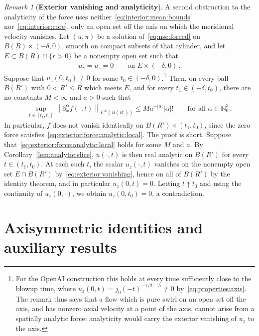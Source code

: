 \documentclass[11pt,reqno]{amsproc}
\numberwithin{equation}{section}
\theoremstyle{remark}
\newtheorem{remark}[theorem]{Remark}
\newcommand{\p}{\partial}
\newcommand{\norm}[1]{\left\|#1\right\|}
\begin{document}
\begin{remark}[{\bf Exterior vanishing and analyticity}]
\label{rem:exterior:nonanalytic}
A second obstruction to the analyticity of the force uses neither~\eqref{eq:interior:mean:bounds} nor~\eqref{eq:interior:core}, only an open set off the axis on which the meridional velocity vanishes. Let $(u,\pi)$ be a solution of~\eqref{eq:nse:forced} on $B(R)\times(-\delta,0)$, smooth on compact subsets of that cylinder, and let $E\subset B(R)\cap\{r>0\}$ be a nonempty open set such that 
\begin{align}
u_r=u_z=0
\qquad\mbox{on }E\times(-\delta,0)
\,.
\label{eq:exterior:vanishing}
\end{align}
Suppose that $u_z(0,t_0)\ne0$ for some $t_0\in(-\delta,0)$.\footnote{For the OpenAI construction this holds at every time sufficiently close to the blowup time, where $u_z(0,t)=j_0(-t)^{-1/2-h}\ne0$ by~\eqref{eq:properties:axis}. The remark thus says that a flow which is pure swirl on an open set off the axis, and has nonzero axial velocity at a point of the axis, cannot arise from a spatially analytic force: analyticity would carry the exterior vanishing of $u_z$ to the axis.} Then, on every ball $B(R')$ with $0<R'\le R$ which meets $E$, and for every $t_1\in(-\delta,t_0)$, there are no constants $M<\infty$ and $a>0$ such that
\begin{align}
\sup_{t\in[t_1,t_0]}\norm{\p_x^\alpha f(\cdot,t)}_{L^\infty(B(R'))}
\le Ma^{-|\alpha|}|\alpha|!
\qquad\mbox{for all }\alpha\in\mathbb N_0^3
\,.
\label{eq:exterior:force:analytic:local}
\end{align}
In particular, $f$ does not vanish identically on $B(R')\times(t_1,t_0)$, since the zero force satisfies~\eqref{eq:exterior:force:analytic:local}.
The proof is short. Suppose that~\eqref{eq:exterior:force:analytic:local} holds for some $M$ and $a$. By Corollary~\ref{lem:analytic:slice}, $u(\cdot,t)$ is then real analytic on $B(R')$ for every $t\in(t_1,t_0)$. At each such $t$, the scalar $u_z(\cdot,t)$ vanishes on the nonempty open set $E\cap B(R')$ by~\eqref{eq:exterior:vanishing}, hence on all of $B(R')$ by the identity theorem, and in particular $u_z(0,t)=0$. Letting $t\uparrow t_0$ and using the continuity of $u_z(0,\cdot)$, we obtain $u_z(0,t_0)=0$, a contradiction.
\end{remark}

\section{Axisymmetric identities and auxiliary results}
\label{sec:aniso:identities}
\end{document}
